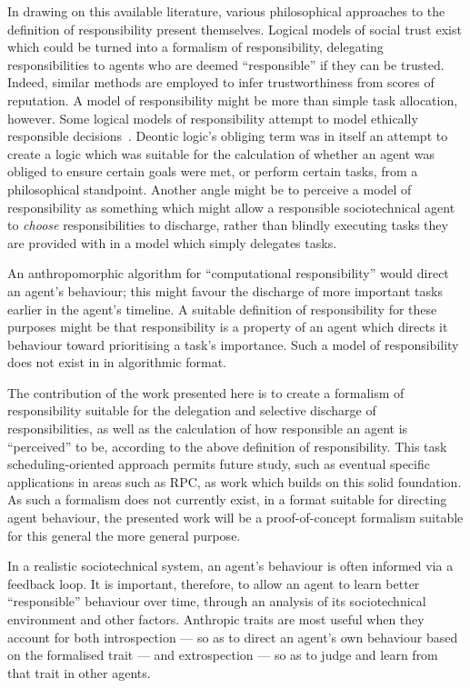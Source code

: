 In drawing on this available literature, various philosophical approaches to the definition of responsibility present themselves. Logical models of social trust exist which could be turned into a formalism of responsibility, delegating responsibilities to agents who are deemed ``responsible'' if they can be trusted. Indeed, similar methods are employed to infer trustworthiness from scores of reputation\cite{eigentrust}. A model of responsibility might be more than simple task allocation, however. Some logical models of responsibility attempt to model ethically responsible decisions~\cite{berreby2015modelling}. Deontic logic's obliging term was in itself an attempt to create a logic which was suitable for the calculation of whether an agent was obliged to ensure certain goals were met, or perform certain tasks, from a philosophical standpoint. Another angle might be to perceive a model of responsibility as something which might allow a responsible sociotechnical agent to \emph{choose} responsibilities to discharge, rather than blindly executing tasks they are provided with in a model which simply delegates tasks.\par

An anthropomorphic algorithm for ``computational responsibility'' would direct an agent's behaviour; this might favour the discharge of more important tasks earlier in the agent's timeline. A suitable definition of responsibility for these purposes might be that responsibility is a property of an agent which directs it behaviour toward prioritising a task's importance. Such a model of responsibility does not exist in in algorithmic format.\par


The contribution of the work presented here is to create a formalism of responsibility suitable for the delegation and selective discharge of responsibilities, as well as the calculation of how responsible an agent is ``perceived'' to be, according to the above definition of responsibility. This task scheduling-oriented approach permits future study, such as eventual specific applications in areas such as RPC, as work which builds on this solid foundation. As such a formalism does not currently exist, in a format suitable for directing agent behaviour, the presented work will be a proof-of-concept formalism suitable for this general the more general purpose.\par

In a realistic sociotechnical system, an agent's behaviour is often informed via a feedback loop. It is important, therefore, to allow an agent to learn better ``responsible'' behaviour over time, through an analysis of its sociotechnical environment and other factors. Anthropic traits are most useful when they account for both introspection --- so as to direct an agent's own behaviour based on the formalised trait --- and extrospection --- so as to judge and learn from that trait in other agents.\par

